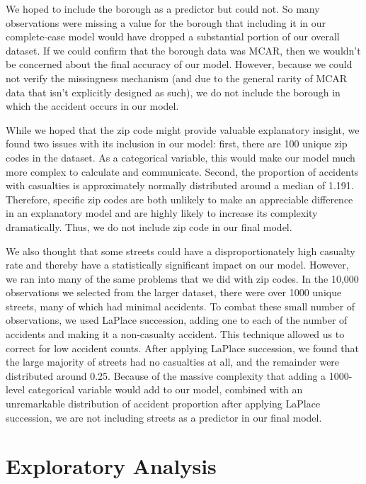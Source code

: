 \documentclass[
  letterpaper,
  DIV=11,
  numbers=noendperiod]{scrartcl}
\begin{document}
We hoped to include the borough as a predictor but could not. So many
observations were missing a value for the borough that including it in
our complete-case model would have dropped a substantial portion of our
overall dataset. If we could confirm that the borough data was MCAR,
then we wouldn't be concerned about the final accuracy of our model.
However, because we could not verify the missingness mechanism (and due
to the general rarity of MCAR data that isn't explicitly designed as
such), we do not include the borough in which the accident occurs in our
model.

While we hoped that the zip code might provide valuable explanatory
insight, we found two issues with its inclusion in our model: first,
there are 100 unique zip codes in the dataset. As a categorical
variable, this would make our model much more complex to calculate and
communicate. Second, the proportion of accidents with casualties is
approximately normally distributed around a median of 1.191. Therefore,
specific zip codes are both unlikely to make an appreciable difference
in an explanatory model and are highly likely to increase its complexity
dramatically. Thus, we do not include zip code in our final model.

We also thought that some streets could have a disproportionately high
casualty rate and thereby have a statistically significant impact on our
model. However, we ran into many of the same problems that we did with
zip codes. In the 10,000 observations we selected from the larger
dataset, there were over 1000 unique streets, many of which had minimal
accidents. To combat these small number of observations, we used LaPlace
succession, adding one to each of the number of accidents and making it
a non-casualty accident. This technique allowed us to correct for low
accident counts. After applying LaPlace succession, we found that the
large majority of streets had no casualties at all, and the remainder
were distributed around 0.25. Because of the massive complexity that
adding a 1000-level categorical variable would add to our model,
combined with an unremarkable distribution of accident proportion after
applying LaPlace succession, we are not including streets as a predictor
in our final model.

\hypertarget{exploratory-analysis}{%
\section{Exploratory Analysis}\label{exploratory-analysis}}
\end{document}

